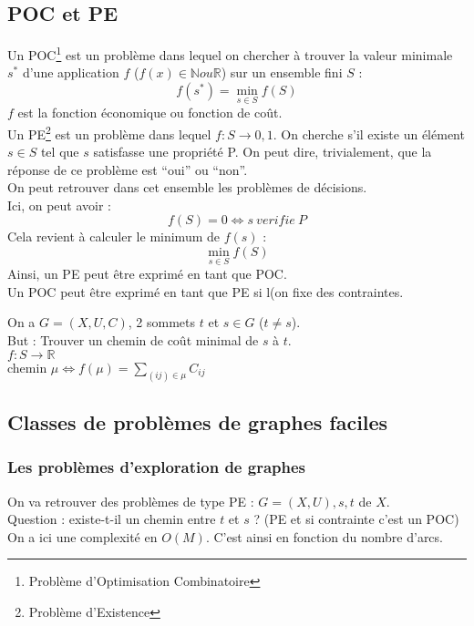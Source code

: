 \subsection{POC et PE}
Un POC\footnote{Problème d'Optimisation Combinatoire} est un problème dans lequel on chercher à trouver la valeur minimale $s^{*}$ d'une application $f$ ($f(x) \in \mathbb{N} ou \mathbb{R}$) sur un ensemble fini $S$ : 
\begin{equation}
 f(s^*)=\min_{s\in S}{f(S)}
\end{equation}
$f$ est la fonction économique ou fonction de coût.\\
Un PE\footnote{Problème d’Existence} est un problème dans lequel $f: S \rightarrow {0,1}$. On cherche s'il existe un élément $s\in S$ tel que $s$ satisfasse une propriété P. On peut dire, trivialement, que la réponse de ce problème est \enquote{oui} ou \enquote{non}.\\
On peut retrouver dans cet ensemble les problèmes de décisions.\\
Ici, on peut avoir :
\begin{equation}
 f(S)=0 \Leftrightarrow s~verifie~P
\end{equation}
Cela revient à calculer le minimum de $f(s)$ : 
\begin{equation}
 \min_{s\in S}{f(S)}
\end{equation}
Ainsi, un PE peut être exprimé en tant que POC.\\
Un POC peut être exprimé en tant que PE si l(on fixe des contraintes.\\
\begin{exo}
 On a $G=(X,U,C)$, 2 sommets $t$ et $s \in G$ ($t\neq s$).\\
 But : Trouver un chemin de coût minimal de $s$ à $t$.\\
 $f:S\rightarrow \mathbb{R}$\\
 chemin $\mu \Leftrightarrow f(\mu)=\sum_{(ij)\in \mu} C_{ij}$
\end{exo}

\subsection{Classes de problèmes de graphes faciles}
\subsubsection{Les problèmes d'exploration de graphes}
On va retrouver des problèmes de type PE : $G=(X,U), s, t$ de $X$.\\
Question : existe-t-il un chemin entre $t$ et $s$ ? (PE et si contrainte c'est un POC)\\
On a ici une complexité en $O(M)$. C'est ainsi en fonction du nombre d'arcs.
